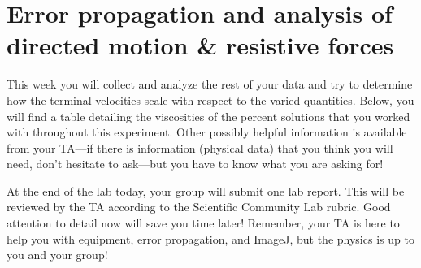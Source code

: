 \section{Error propagation and analysis of directed motion \& resistive forces}
This week you will collect and analyze the rest of your data and try to determine how the terminal velocities scale with respect to the varied quantities.
Below, you will find a table detailing the viscosities of the percent solutions that you worked with throughout this experiment.
Other possibly helpful information is available from your TA—if there is information (physical data) that you think you will need, don't hesitate to ask—but you have to know what you are asking for! \par
At the end of the lab today, your group will submit one lab report.
This will be reviewed by the TA according to the Scientific Community Lab rubric.
Good attention to detail now will save you time later!
Remember, your TA is here to help you with equipment, error propagation, and ImageJ, but the physics is up to you and your group!



